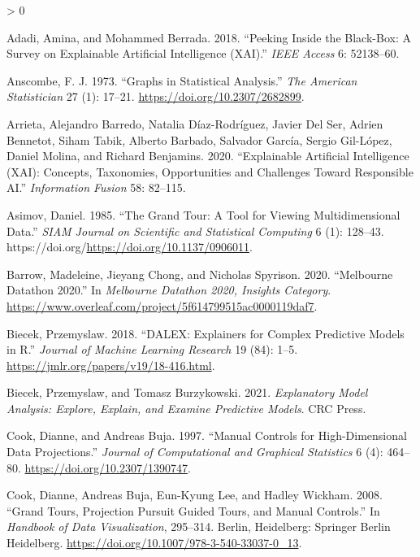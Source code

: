 \documentclass[
  11,
]{article}
\newlength{\cslhangindent}
\newenvironment{CSLReferences}[2] %
 {%
  \setlength{\parindent}{0pt}
  \ifodd #1 \everypar{\setlength{\hangindent}{\cslhangindent}}\ignorespaces\fi
  \ifnum #2 > 0
  \setlength{\parskip}{#2\baselineskip}
  \fi
 }%
 {}
\begin{document}
\hypertarget{refs}{}
\begin{CSLReferences}{1}{0}
\leavevmode\hypertarget{ref-adadi_peeking_2018}{}%
Adadi, Amina, and Mohammed Berrada. 2018. {``Peeking Inside the Black-Box: A Survey on Explainable Artificial Intelligence ({XAI}).''} \emph{IEEE Access} 6: 52138--60.

\leavevmode\hypertarget{ref-anscombe_graphs_1973}{}%
Anscombe, F. J. 1973. {``Graphs in Statistical Analysis.''} \emph{The American Statistician} 27 (1): 17--21. \url{https://doi.org/10.2307/2682899}.

\leavevmode\hypertarget{ref-arrieta_explainable_2020}{}%
Arrieta, Alejandro Barredo, Natalia Díaz-Rodríguez, Javier Del Ser, Adrien Bennetot, Siham Tabik, Alberto Barbado, Salvador García, Sergio Gil-López, Daniel Molina, and Richard Benjamins. 2020. {``Explainable {Artificial} {Intelligence} ({XAI}): {Concepts}, Taxonomies, Opportunities and Challenges Toward Responsible {AI}.''} \emph{Information Fusion} 58: 82--115.

\leavevmode\hypertarget{ref-asimov_grand_1985}{}%
Asimov, Daniel. 1985. {``The Grand Tour: A Tool for Viewing Multidimensional Data.''} \emph{{SIAM} Journal on Scientific and Statistical Computing} 6 (1): 128--43. https://doi.org/\url{https://doi.org/10.1137/0906011}.

\leavevmode\hypertarget{ref-barrow_melbourne_2020}{}%
Barrow, Madeleine, Jieyang Chong, and Nicholas Spyrison. 2020. {``Melbourne {Datathon} 2020.''} In \emph{Melbourne {Datathon} 2020, {Insights} Category}. \url{https://www.overleaf.com/project/5f614799515ac0000119daf7}.

\leavevmode\hypertarget{ref-biecek_dalex_2018}{}%
Biecek, Przemyslaw. 2018. {``{DALEX}: {Explainers} for {Complex} {Predictive} {Models} in {R}.''} \emph{Journal of Machine Learning Research} 19 (84): 1--5. \url{https://jmlr.org/papers/v19/18-416.html}.

\leavevmode\hypertarget{ref-biecek_explanatory_2021}{}%
Biecek, Przemyslaw, and Tomasz Burzykowski. 2021. \emph{Explanatory Model Analysis: Explore, Explain, and Examine Predictive Models}. CRC Press.

\leavevmode\hypertarget{ref-cook_manual_1997}{}%
Cook, Dianne, and Andreas Buja. 1997. {``Manual Controls for High-Dimensional Data Projections.''} \emph{Journal of Computational and Graphical Statistics} 6 (4): 464--80. \url{https://doi.org/10.2307/1390747}.

\leavevmode\hypertarget{ref-cook_grand_2008}{}%
Cook, Dianne, Andreas Buja, Eun-Kyung Lee, and Hadley Wickham. 2008. {``Grand Tours, Projection Pursuit Guided Tours, and Manual Controls.''} In \emph{Handbook of Data Visualization}, 295--314. Berlin, Heidelberg: Springer Berlin Heidelberg. \url{https://doi.org/10.1007/978-3-540-33037-0_13}.


\end{CSLReferences}
\end{document}
